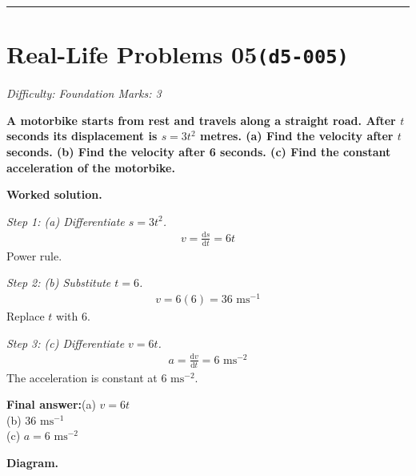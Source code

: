 \documentclass[11pt]{article}
\newcommand{\question}[1]{\par\medskip\noindent\textbf{#1}\par}
\begin{document}
\medskip\hrule

\section*{Real-Life Problems 05\quad\small\texttt{(d5-005)}}
\textit{Difficulty: Foundation \quad\textbar\quad Marks: 3}

\question{A motorbike starts from rest and travels along a straight road. After \( t \) seconds its displacement is \( s = 3t^2 \) metres. (a) Find the velocity after \( t \) seconds. (b) Find the velocity after 6 seconds. (c) Find the constant acceleration of the motorbike.}

\textbf{Worked solution.}

\textit{Step 1: (a) Differentiate \( s = 3t^2 \).}
\[\begin{gathered}
v = \frac{\mathrm{d}s}{\mathrm{d}t} = 6t
\end{gathered}\]
Power rule.

\textit{Step 2: (b) Substitute \( t = 6 \).}
\[\begin{gathered}
v = 6(6) = 36 \text{ ms}^{-1}
\end{gathered}\]
Replace \( t \) with 6.

\textit{Step 3: (c) Differentiate \( v = 6t \).}
\[\begin{gathered}
a = \frac{\mathrm{d}v}{\mathrm{d}t} = 6 \text{ ms}^{-2}
\end{gathered}\]
The acceleration is constant at \( 6 \text{ ms}^{-2} \).

\begin{answerbox}
\textbf{Final answer:}\quad (a) \(\displaystyle  v = 6t \) \\[3pt]  (b) \(\displaystyle  36 \text{ ms}^{-1} \) \\[3pt]  (c) \(\displaystyle  a = 6 \text{ ms}^{-2} \)
\end{answerbox}
\textbf{Diagram.}
\end{document}
